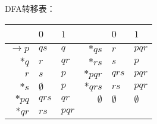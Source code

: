 \begin{solution}DFA转移表：
\begin{center}
    \begin{tabular}{r||l|l||r||l|l}
                        & $0$           & $1$   & ~             & $0$           & $1$\\ \hline \hline
        $\rightarrow p$ & $qs$          & $q$   & $*qs$         & $r$           & $pqr$\\
        $*q$            & $r$           & $qr$  & $*rs$         & $s$           & $p$\\
        $r$             & $s$           & $p$   & $*pqr$        & $qrs$         & $pqr$\\
        $*s$            & $\emptyset$   & $p$   & $*qrs$        & $rs$          & $pqr$\\
        $*pq$           & $qrs$         & $qr$  & $\emptyset$   & $\emptyset$   & $\emptyset$\\
        $*qr$           & $rs$          & $pqr$
    \end{tabular}
\end{center}
        








\end{solution}